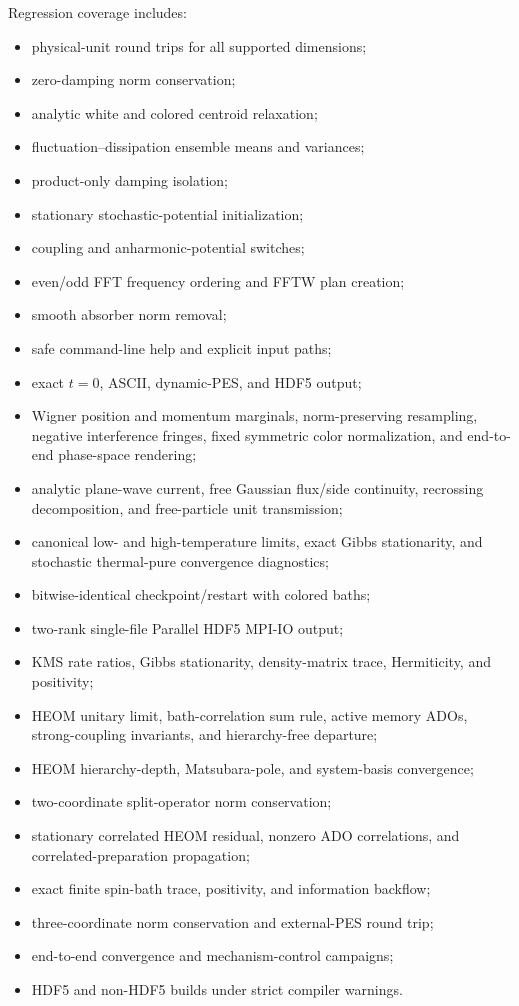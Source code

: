 \documentclass[11pt]{article}
\begin{document}
Regression coverage includes:
\begin{itemize}
  \item physical-unit round trips for all supported dimensions;
  \item zero-damping norm conservation;
  \item analytic white and colored centroid relaxation;
  \item fluctuation--dissipation ensemble means and variances;
  \item product-only damping isolation;
  \item stationary stochastic-potential initialization;
  \item coupling and anharmonic-potential switches;
  \item even/odd FFT frequency ordering and FFTW plan creation;
  \item smooth absorber norm removal;
  \item safe command-line help and explicit input paths;
  \item exact $t=0$, ASCII, dynamic-PES, and HDF5 output;
  \item Wigner position and momentum marginals, norm-preserving resampling,
        negative interference fringes, fixed symmetric color normalization, and
        end-to-end phase-space rendering;
  \item analytic plane-wave current, free Gaussian flux/side continuity,
        recrossing decomposition, and free-particle unit transmission;
  \item canonical low- and high-temperature limits, exact Gibbs stationarity,
        and stochastic thermal-pure convergence diagnostics;
  \item bitwise-identical checkpoint/restart with colored baths;
  \item two-rank single-file Parallel HDF5 MPI-IO output;
  \item KMS rate ratios, Gibbs stationarity, density-matrix trace, Hermiticity,
        and positivity;
  \item HEOM unitary limit, bath-correlation sum rule, active memory ADOs,
        strong-coupling invariants, and hierarchy-free departure;
  \item HEOM hierarchy-depth, Matsubara-pole, and system-basis convergence;
  \item two-coordinate split-operator norm conservation;
  \item stationary correlated HEOM residual, nonzero ADO correlations, and
        correlated-preparation propagation;
  \item exact finite spin-bath trace, positivity, and information backflow;
  \item three-coordinate norm conservation and external-PES round trip;
  \item end-to-end convergence and mechanism-control campaigns;
  \item HDF5 and non-HDF5 builds under strict compiler warnings.
\end{itemize}
\end{document}
